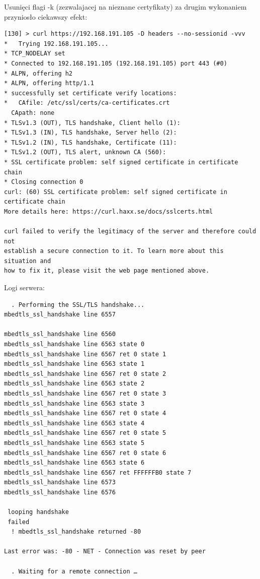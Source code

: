 Usunięci flagi -k (zezwalajacej na nieznane certyfikaty) za drugim wykonaniem przyniosło ciekawszy efekt:

\begin{verbatim}
[130] > curl https://192.168.191.105 -D headers --no-sessionid -vvv
*   Trying 192.168.191.105...
* TCP_NODELAY set
* Connected to 192.168.191.105 (192.168.191.105) port 443 (#0)
* ALPN, offering h2
* ALPN, offering http/1.1
* successfully set certificate verify locations:
*   CAfile: /etc/ssl/certs/ca-certificates.crt
  CApath: none
* TLSv1.3 (OUT), TLS handshake, Client hello (1):
* TLSv1.3 (IN), TLS handshake, Server hello (2):
* TLSv1.2 (IN), TLS handshake, Certificate (11):
* TLSv1.2 (OUT), TLS alert, unknown CA (560):
* SSL certificate problem: self signed certificate in certificate chain
* Closing connection 0
curl: (60) SSL certificate problem: self signed certificate in certificate chain
More details here: https://curl.haxx.se/docs/sslcerts.html

curl failed to verify the legitimacy of the server and therefore could not
establish a secure connection to it. To learn more about this situation and
how to fix it, please visit the web page mentioned above.
\end{verbatim}

Logi serwera:
\begin{verbatim}
  . Performing the SSL/TLS handshake...
mbedtls_ssl_handshake line 6557

mbedtls_ssl_handshake line 6560
mbedtls_ssl_handshake line 6563 state 0
mbedtls_ssl_handshake line 6567 ret 0 state 1
mbedtls_ssl_handshake line 6563 state 1
mbedtls_ssl_handshake line 6567 ret 0 state 2
mbedtls_ssl_handshake line 6563 state 2
mbedtls_ssl_handshake line 6567 ret 0 state 3
mbedtls_ssl_handshake line 6563 state 3
mbedtls_ssl_handshake line 6567 ret 0 state 4
mbedtls_ssl_handshake line 6563 state 4
mbedtls_ssl_handshake line 6567 ret 0 state 5
mbedtls_ssl_handshake line 6563 state 5
mbedtls_ssl_handshake line 6567 ret 0 state 6
mbedtls_ssl_handshake line 6563 state 6
mbedtls_ssl_handshake line 6567 ret FFFFFFB0 state 7
mbedtls_ssl_handshake line 6573
mbedtls_ssl_handshake line 6576

 looping handshake
 failed
  ! mbedtls_ssl_handshake returned -80

Last error was: -80 - NET - Connection was reset by peer

  . Waiting for a remote connection …
\end{verbatim}

